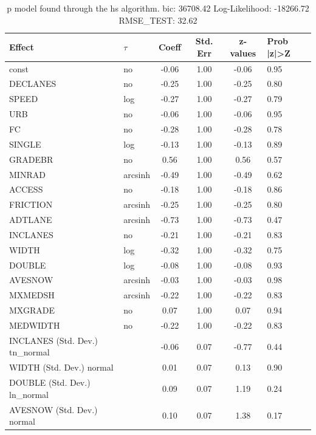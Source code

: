 \begin{table}
	\caption{p model found through the hs algorithm. bic: 36708.42 Log-Likelihood: -18266.72 RMSE_TEST: 32.62}
	\begin{center}
		\begin{tabular}{|l|l|c|c|c|l|}
			\hline
			Effect & $\tau$ & Coeff & Std. Err & z-values & Prob |z|>Z \\
			\hline
			const & no & -0.06 & 1.00 & -0.06 & 0.95 \\
			\hline
			DECLANES & no & -0.25 & 1.00 & -0.25 & 0.80 \\
			\hline
			SPEED & log & -0.27 & 1.00 & -0.27 & 0.79 \\
			\hline
			URB & no & -0.06 & 1.00 & -0.06 & 0.95 \\
			\hline
			FC & no & -0.28 & 1.00 & -0.28 & 0.78 \\
			\hline
			SINGLE & log & -0.13 & 1.00 & -0.13 & 0.89 \\
			\hline
			GRADEBR & no & 0.56 & 1.00 & 0.56 & 0.57 \\
			\hline
			MINRAD & arcsinh & -0.49 & 1.00 & -0.49 & 0.62 \\
			\hline
			ACCESS & no & -0.18 & 1.00 & -0.18 & 0.86 \\
			\hline
			FRICTION & arcsinh & -0.25 & 1.00 & -0.25 & 0.80 \\
			\hline
			ADTLANE & arcsinh & -0.73 & 1.00 & -0.73 & 0.47 \\
			\hline
			INCLANES & no & -0.21 & 1.00 & -0.21 & 0.83 \\
			\hline
			WIDTH & log & -0.32 & 1.00 & -0.32 & 0.75 \\
			\hline
			DOUBLE & log & -0.08 & 1.00 & -0.08 & 0.93 \\
			\hline
			AVESNOW & arcsinh & -0.03 & 1.00 & -0.03 & 0.98 \\
			\hline
			MXMEDSH & arcsinh & -0.22 & 1.00 & -0.22 & 0.83 \\
			\hline
			MXGRADE & no & 0.07 & 1.00 & 0.07 & 0.94 \\
			\hline
			MEDWIDTH & no & -0.22 & 1.00 & -0.22 & 0.83 \\
			\hline
			INCLANES (Std. Dev.) tn_normal &  & -0.06 & 0.07 & -0.77 & 0.44 \\
			\hline
			WIDTH (Std. Dev.) normal &  & 0.01 & 0.07 & 0.13 & 0.90 \\
			\hline
			DOUBLE (Std. Dev.) ln_normal &  & 0.09 & 0.07 & 1.19 & 0.24 \\
			\hline
			AVESNOW (Std. Dev.) normal &  & 0.10 & 0.07 & 1.38 & 0.17 \\

\end{tabular}
\end{center}
\end{table}
